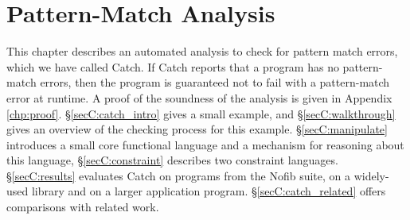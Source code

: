 
\begin{comment}
\h{.*}\begin{code}
import Prelude hiding (map, (||),($))
import Data.Array
import Data.Maybe
import System.Environment
import Data.Char
import Data.List hiding (map)

infixr 2  ||

data Expr = EVar String
          | ECon String [Expr]
          | EFun String [Expr]
          | EApp Expr [Expr]
          | ELam String Expr
          | ELet String Expr Expr
          | ECase Expr [Alt]

data Alt = EAlt String [String] Expr

type FuncName = String
type CtorName = String
type VarName = String

body   :: FuncName  -> Expr
args   :: FuncName  -> [VarName]
rhs    :: Alt       -> Expr
arity  :: String    -> Int
ctors  :: CtorName  -> [CtorName]

ellipses :: a
computation :: ()

instance Eq a => Eq (Prop a)

infix 0  ==>
(==>) :: Bool -> Bool -> Bool
infixr 1  $
($) :: (a -> b) -> a -> b
\end{code}
\h{.mp}\begin{code}
instance Eq Val
\end{code}
\end{comment}


\newcommand{\rec}[1]{\hspace{-0.75ex}_{#1}}


\newcommand{\para}[1]{\vspace{2mm}\noindent\textbf{#1}}


\chapter{Pattern-Match Analysis}
\label{chp:catch}

This chapter describes an automated analysis to check for pattern match errors, which we have called Catch. If Catch reports that a program has no pattern-match errors, then the program is guaranteed not to fail with a pattern-match error at runtime. A proof of the soundness of the analysis is given in Appendix \ref{chp:proof}. \S\ref{secC:catch_intro} gives a small example, and \S\ref{secC:walkthrough} gives an overview of the checking process for this example. \S\ref{secC:manipulate} introduces a small core functional language and a mechanism for reasoning about this language, \S\ref{secC:constraint} describes two constraint languages. \S\ref{secC:results} evaluates Catch on programs from the Nofib suite, on a widely-used library and on a larger application program. \S\ref{secC:catch_related} offers comparisons with related work.


